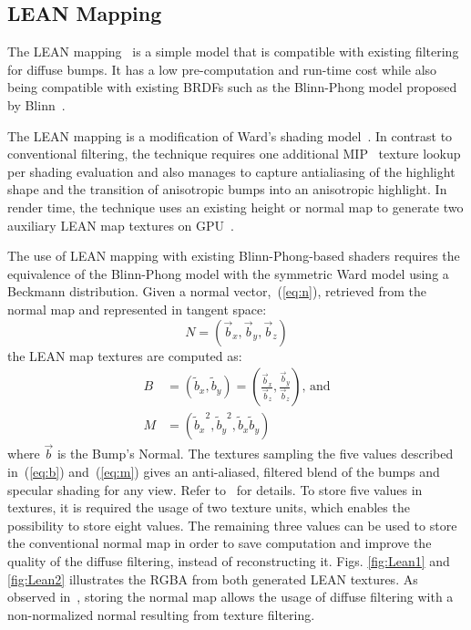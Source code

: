\documentclass[10pt, conference]{IEEEtran}
\begin{document}
\subsection{LEAN Mapping}
%
The LEAN mapping~\cite{Olano:2010:LM:1730804.1730834} is a simple model that is compatible with existing filtering for diffuse bumps. It has a low pre-computation and run-time cost while also being compatible with existing BRDFs such as the Blinn-Phong model proposed by Blinn~\cite{Blinn:1977:MLR:563858.563893}.

The LEAN mapping is a modification of Ward's shading model~\cite{Ward:1992:MMA:133994.134078}. In contrast to conventional filtering, the technique requires one additional MIP~\cite{Williams:1983:PP:800059.801126} texture lookup per shading evaluation and also manages to capture antialiasing of the highlight shape and the transition of anisotropic bumps into an anisotropic highlight. In render time, the technique uses an existing height or normal map to generate two auxiliary LEAN map textures on GPU~\cite{Olano:2010:LM:1730804.1730834}.

The use of LEAN mapping with existing Blinn-Phong-based shaders requires the equivalence of the Blinn-Phong model with the symmetric Ward model using a Beckmann distribution. Given a normal vector,~(\ref{eq:n}), retrieved from the normal map and represented in tangent space:
\begin{equation}
	\label{eq:n}
	N = (\vec{b}_{x}, \vec{b}_{y}, \vec{b}_{z})
\end{equation}
the LEAN map textures are computed as:
\begin{align}
	\label{eq:b}
	B &= (\tilde{b}_{x}, \tilde{b}_{y}) = \left(\frac{\vec{b}_{x}}{\vec{b}_{z}}, \frac{\vec{b}_{y}}{\vec{b}_{z}}\right) \text{, and}\\
	\label{eq:m}
	M &= ({\tilde{b}_{x}}^{2}, {\tilde{b}_{y}}^{2}, \tilde{b}_{x}\tilde{b}_{y})
\end{align}
where $\vec{b}$ is the Bump's Normal. The textures sampling the five values described in~(\ref{eq:b}) and~(\ref{eq:m}) gives an anti-aliased, filtered blend of the bumps and specular shading for any view. Refer to~\cite{Olano:2010:LM:1730804.1730834} for details. To store five values in textures, it is required the usage of two texture units, which enables the possibility to store eight values. The remaining three values can be used to store the conventional normal map in order to save computation and improve the quality of the diffuse filtering, instead of reconstructing it. Figs. \ref{fig:Lean1} and \ref{fig:Lean2} illustrates the RGBA from both generated LEAN textures. As observed in~\cite{Kilgard00apractical}, storing the normal map allows the usage of diffuse filtering with a non-normalized normal resulting from texture filtering.
\end{document}
